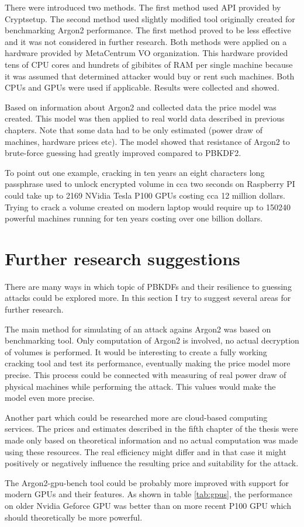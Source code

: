 \documentclass[nolof]{fithesis3}
\begin{document}
There were introduced two methods. The first method used API provided by Cryptsetup. The second method used slightly modified tool originally created for benchmarking Argon2 performance. The first method proved to be less effective and it was not considered in further research. Both methods were applied on a hardware provided by MetaCentrum VO organization. This hardware provided tens of CPU cores and hundrets of gibibites of RAM per single machine because it was assumed that determined attacker would buy or rent such machines. Both CPUs and GPUs were used if applicable. Results were collected and showed.

Based on information about Argon2 and collected data the price model was created. This model was then applied to real world data described in previous chapters. Note that some data had to be only estimated (power draw of machines, hardware prices etc). The model showed that resistance of Argon2 to brute-force guessing had greatly improved compared to PBKDF2.

To point out one example, cracking in ten years an eight characters long passphrase used to unlock encrypted volume in cca two seconds on Raspberry PI could take up to 2169 NVidia Tesla P100 GPUs costing cca 12 million dollars. Trying to crack a volume created on modern laptop would require up to 150240 powerful machines running for ten years costing over one billion dollars.

\section{Further research suggestions}
There are many ways in which topic of PBKDFs and their resilience to guessing attacks could be explored more. In this section I try to suggest several areas for further research.

The main method for simulating of an attack agains Argon2 was based on benchmarking tool. Only computation of Argon2 is involved, no actual decryption of volumes is performed. It would be interesting to create a fully working cracking tool and test its performance, eventually making the price model more precise. This process could be connected with measuring of real power draw of physical machines while performing the attack. This values would make the model even more precise.

Another part which could be researched more are cloud-based computing services. The prices and estimates described in the fifth chapter of the thesis were made only based on theoretical information and no actual computation was made using these resources. The real efficiency might differ and in that case it might positively or negatively influence the resulting price and suitability for the attack.

The Argon2-gpu-bench tool could be probably more improved with support for modern GPUs and their features. As shown in table \ref{tab:gpus}, the performance on older Nvidia Geforce GPU was better than on more recent P100 GPU which should theoretically be more powerful.





\printbibliography
\end{document}
